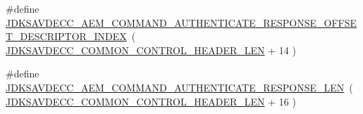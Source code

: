 \begin{DoxyCompactItemize}
\#define \hyperlink{group__command__authenticate__response_gacaac241374335edbf8b9b01b7856a6da}{J\+D\+K\+S\+A\+V\+D\+E\+C\+C\+\_\+\+A\+E\+M\+\_\+\+C\+O\+M\+M\+A\+N\+D\+\_\+\+A\+U\+T\+H\+E\+N\+T\+I\+C\+A\+T\+E\+\_\+\+R\+E\+S\+P\+O\+N\+S\+E\+\_\+\+O\+F\+F\+S\+E\+T\+\_\+\+D\+E\+S\+C\+R\+I\+P\+T\+O\+R\+\_\+\+I\+N\+D\+EX}~( \hyperlink{group__jdksavdecc__avtp__common__control__header_gaae84052886fb1bb42f3bc5f85b741dff}{J\+D\+K\+S\+A\+V\+D\+E\+C\+C\+\_\+\+C\+O\+M\+M\+O\+N\+\_\+\+C\+O\+N\+T\+R\+O\+L\+\_\+\+H\+E\+A\+D\+E\+R\+\_\+\+L\+EN} + 14 )
\item 
\#define \hyperlink{group__command__authenticate__response_ga021001da40062d978e3c0dec6c38023d}{J\+D\+K\+S\+A\+V\+D\+E\+C\+C\+\_\+\+A\+E\+M\+\_\+\+C\+O\+M\+M\+A\+N\+D\+\_\+\+A\+U\+T\+H\+E\+N\+T\+I\+C\+A\+T\+E\+\_\+\+R\+E\+S\+P\+O\+N\+S\+E\+\_\+\+L\+EN}~( \hyperlink{group__jdksavdecc__avtp__common__control__header_gaae84052886fb1bb42f3bc5f85b741dff}{J\+D\+K\+S\+A\+V\+D\+E\+C\+C\+\_\+\+C\+O\+M\+M\+O\+N\+\_\+\+C\+O\+N\+T\+R\+O\+L\+\_\+\+H\+E\+A\+D\+E\+R\+\_\+\+L\+EN} + 16 )
\end{DoxyCompactItemize}
